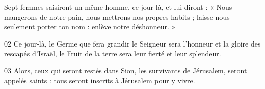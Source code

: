 Sept femmes saisiront un même homme, ce jour-là, et lui diront : « Nous mangerons de notre pain, nous mettrons nos propres habits ; laisse-nous seulement porter ton nom : enlève notre déshonneur. »

02 Ce jour-là, le Germe que fera grandir le Seigneur sera l’honneur et la gloire des rescapés d’Israël, le Fruit de la terre sera leur fierté et leur splendeur.

03 Alors, ceux qui seront restés dans Sion, les survivants de Jérusalem, seront appelés saints : tous seront inscrits à Jérusalem pour y vivre.